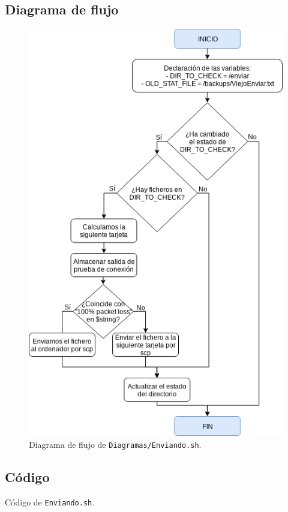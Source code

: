 \subsection{Diagrama de flujo}
\begin{figure}[h]
	\centering
	\includegraphics[scale=0.65]{Anexos/Anexo3/Diagramas/Enviando.png}
	\caption{Diagrama de flujo de \texttt{Diagramas/Enviando.sh}.}
	\label{Diagrama de flujo de Enviando.sh}
\end{figure}

\newpage
\subsection{Código}

\begin{center}
	Código de \texttt{Enviando.sh}.
\end{center}


